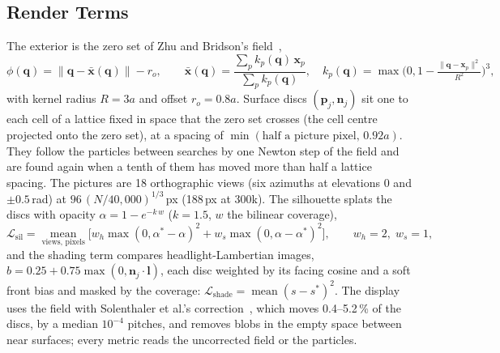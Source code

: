 \subsection{Render Terms}
\label{app:ch4_render}
The exterior is the zero set of Zhu and Bridson's field~\citep{10.1145/1073204.1073298},
\begin{equation}
\phi(\mathbf{q})=\lVert\mathbf{q}-\bar{\mathbf{x}}(\mathbf{q})\rVert-r_o,\qquad
\bar{\mathbf{x}}(\mathbf{q})=\frac{\sum_p k_p(\mathbf{q})\,\mathbf{x}_p}{\sum_p k_p(\mathbf{q})},\quad
k_p(\mathbf{q})=\max\!\Big(0,1-\tfrac{\lVert\mathbf{q}-\mathbf{x}_p\rVert^2}{R^2}\Big)^{3},
\end{equation}
with kernel radius $R=3a$ and offset $r_o=0.8a$. Surface discs $(\mathbf{p}_j,\mathbf{n}_j)$ sit one to each cell of a
lattice fixed in space that the zero set crosses (the cell centre projected onto the zero set), at a spacing of
$\min(\text{half a picture pixel},\,0.92a)$. They follow the particles between searches by one Newton step of the field and
are found again when a tenth of them has moved more than half a lattice spacing. The pictures are 18 orthographic views
(six azimuths at elevations $0$ and $\pm0.5$\,rad) at $96\,(N/40{,}000)^{1/3}$\,px (188\,px at 300k). The silhouette
splats the discs with opacity $\alpha=1-e^{-k\,w}$ ($k=1.5$, $w$ the bilinear coverage),
\begin{equation}
\mathcal{L}_{\mathrm{sil}}=\operatorname*{mean}_{\text{views, pixels}}\Big[w_h\max(0,\alpha^\ast-\alpha)^2
 +w_s\max(0,\alpha-\alpha^\ast)^2\Big],\qquad w_h=2,\;w_s=1 ,
\end{equation}
and the shading term compares headlight-Lambertian images, $b=0.25+0.75\max(0,\mathbf{n}_j\cdot\mathbf{l})$, each disc
weighted by its facing cosine and a soft front bias and masked by the coverage:
$\mathcal{L}_{\mathrm{shade}}=\operatorname{mean}(s-s^\ast)^2$. The display uses the field with Solenthaler et al.'s
correction~\citep{solenthaler2007unified}, which moves 0.4--5.2\,\% of the discs, by a median $10^{-4}$ pitches, and removes
blobs in the empty space between near surfaces; every metric reads the uncorrected field or the particles.

